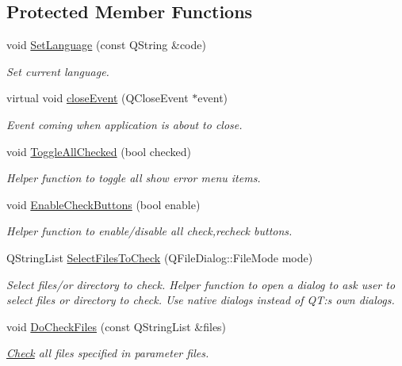 \subsection*{Protected Member Functions}
\begin{DoxyCompactItemize}
\item 
void \hyperlink{class_main_window_a846bd27baa737bd0e8177a24293bab9a}{Set\-Language} (const Q\-String \&code)
\begin{DoxyCompactList}\small\item\em Set current language. \end{DoxyCompactList}\item 
virtual void \hyperlink{class_main_window_a4e20a4a065fbb0e4d3532a45a0a91425}{close\-Event} (Q\-Close\-Event $\ast$event)
\begin{DoxyCompactList}\small\item\em Event coming when application is about to close. \end{DoxyCompactList}\item 
void \hyperlink{class_main_window_a12ee09e9651f5733477179ed47a35aa0}{Toggle\-All\-Checked} (bool checked)
\begin{DoxyCompactList}\small\item\em Helper function to toggle all show error menu items. \end{DoxyCompactList}\item 
void \hyperlink{class_main_window_ac5c5446a85f04c3fefa23381b70ccf1a}{Enable\-Check\-Buttons} (bool enable)
\begin{DoxyCompactList}\small\item\em Helper function to enable/disable all check,recheck buttons. \end{DoxyCompactList}\item 
Q\-String\-List \hyperlink{class_main_window_afd62a69e2fd5374680c79c3088ab75ee}{Select\-Files\-To\-Check} (Q\-File\-Dialog\-::\-File\-Mode mode)
\begin{DoxyCompactList}\small\item\em Select files/or directory to check. Helper function to open a dialog to ask user to select files or directory to check. Use native dialogs instead of Q\-T\-:s own dialogs. \end{DoxyCompactList}\item 
void \hyperlink{class_main_window_a15ea3f6407afe4ba11986cb71c3d9901}{Do\-Check\-Files} (const Q\-String\-List \&files)
\begin{DoxyCompactList}\small\item\em \hyperlink{class_check}{Check} all files specified in parameter files. \end{DoxyCompactList}\item 

\end{DoxyCompactItemize}
